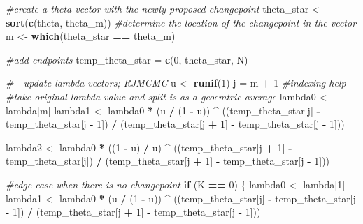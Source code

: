 \documentclass[11pt,a4paper]{article}
\newenvironment{Shaded}{\begin{snugshade}}{\end{snugshade}}
\newcommand{\CommentTok}[1]{\textcolor[rgb]{0.56,0.35,0.01}{\textit{#1}}}
\newcommand{\ControlFlowTok}[1]{\textcolor[rgb]{0.13,0.29,0.53}{\textbf{#1}}}
\newcommand{\DecValTok}[1]{\textcolor[rgb]{0.00,0.00,0.81}{#1}}
\newcommand{\KeywordTok}[1]{\textcolor[rgb]{0.13,0.29,0.53}{\textbf{#1}}}
\newcommand{\NormalTok}[1]{#1}
\newcommand{\OperatorTok}[1]{\textcolor[rgb]{0.81,0.36,0.00}{\textbf{#1}}}
\newcommand{\StringTok}[1]{\textcolor[rgb]{0.31,0.60,0.02}{#1}}
\begin{document}
\begin{Shaded}
\begin{Highlighting}[]
{  \CommentTok{#create a theta vector with the newly proposed changepoint}
\NormalTok{  theta_star <-}\StringTok{ }\KeywordTok{sort}\NormalTok{(}\KeywordTok{c}\NormalTok{(theta, theta_m))}
  \CommentTok{#determine the location of the changepoint in the vector}
\NormalTok{  m <-}\StringTok{ }\KeywordTok{which}\NormalTok{(theta_star }\OperatorTok{==}\StringTok{ }\NormalTok{theta_m)}
  
  \CommentTok{#add endpoints}
\NormalTok{  temp_theta_star =}\StringTok{ }\KeywordTok{c}\NormalTok{(}\DecValTok{0}\NormalTok{, theta_star, N)}
  
  \CommentTok{#---update lambda vectors; RJMCMC}
\NormalTok{  u <-}\StringTok{ }\KeywordTok{runif}\NormalTok{(}\DecValTok{1}\NormalTok{)}
\NormalTok{  j =}\StringTok{ }\NormalTok{m }\OperatorTok{+}\StringTok{ }\DecValTok{1} \CommentTok{#indexing help}
  \CommentTok{#take original lambda value and split is as a geoemtric average}
\NormalTok{  lambda0 <-}\StringTok{ }\NormalTok{lambda[m]}
\NormalTok{  lambda1 <-}
\StringTok{    }\NormalTok{lambda0 }\OperatorTok{*}\StringTok{ }\NormalTok{(u }\OperatorTok{/}\StringTok{ }\NormalTok{(}\DecValTok{1} \OperatorTok{-}\StringTok{ }\NormalTok{u)) }\OperatorTok{^}
\StringTok{    }\NormalTok{((temp_theta_star[j] }\OperatorTok{-}\StringTok{ }\NormalTok{temp_theta_star[j }\OperatorTok{-}\StringTok{ }\DecValTok{1}\NormalTok{]) }\OperatorTok{/}
\StringTok{                                 }
\StringTok{    }\NormalTok{(temp_theta_star[j }\OperatorTok{+}\StringTok{ }\DecValTok{1}\NormalTok{] }\OperatorTok{-}\StringTok{ }\NormalTok{temp_theta_star[j }\OperatorTok{-}\StringTok{ }\DecValTok{1}\NormalTok{]))}
  
\NormalTok{  lambda2 <-}
\StringTok{    }\NormalTok{lambda0 }\OperatorTok{*}\StringTok{ }\NormalTok{((}\DecValTok{1} \OperatorTok{-}\StringTok{ }\NormalTok{u) }\OperatorTok{/}\StringTok{ }\NormalTok{u) }\OperatorTok{^}
\StringTok{    }\NormalTok{((temp_theta_star[j }\OperatorTok{+}\StringTok{ }\DecValTok{1}\NormalTok{] }\OperatorTok{-}\StringTok{ }\NormalTok{temp_theta_star[j]) }\OperatorTok{/}
\StringTok{    }\NormalTok{(temp_theta_star[j }\OperatorTok{+}\StringTok{ }\DecValTok{1}\NormalTok{] }\OperatorTok{-}\StringTok{ }\NormalTok{temp_theta_star[j }\OperatorTok{-}\StringTok{ }\DecValTok{1}\NormalTok{]))}
  
  \CommentTok{#edge case when there is no changepoint}
  \ControlFlowTok{if}\NormalTok{ (K }\OperatorTok{==}\StringTok{ }\DecValTok{0}\NormalTok{) \{}
\NormalTok{    lambda0 <-}\StringTok{ }\NormalTok{lambda[}\DecValTok{1}\NormalTok{]}
\NormalTok{    lambda1 <-}
\StringTok{      }\NormalTok{lambda0 }\OperatorTok{*}\StringTok{ }\NormalTok{(u }\OperatorTok{/}\StringTok{ }\NormalTok{(}\DecValTok{1} \OperatorTok{-}\StringTok{ }\NormalTok{u)) }\OperatorTok{^}
\StringTok{      }\NormalTok{((temp_theta_star[j] }\OperatorTok{-}\StringTok{ }\NormalTok{temp_theta_star[j }\OperatorTok{-}\StringTok{ }\DecValTok{1}\NormalTok{]) }\OperatorTok{/}
\StringTok{     }\NormalTok{(temp_theta_star[j }\OperatorTok{+}\StringTok{ }\DecValTok{1}\NormalTok{] }\OperatorTok{-}\StringTok{ }\NormalTok{temp_theta_star[j }\OperatorTok{-}\StringTok{ }\DecValTok{1}\NormalTok{]))}
    
}
\end{Highlighting}
\end{Shaded}
\end{document}
